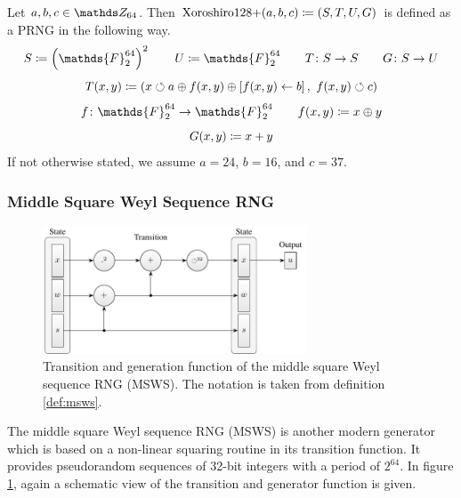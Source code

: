 \documentclass{stdlocal}
\begin{document}
    \begin{definition}[Xoroshiro128+]
    \label{def:xoroshiro}
      Let $a,b,c \in \setInteger_{64}$.
      Then $\mathrm{Xoroshiro128+}(a,b,c)\coloneqq (S,T,U,G)$ is defined as a PRNG in the following way.
      \[
        S \define \roundBrackets{\mathds{F}_2^{64}}^2
        \separate
        U \define \mathds{F}_2^{64}
        \separate
        \function{T}{S}{S}
        \separate
        \function{G}{S}{U}
      \]
      \[
        T(x,y) \coloneqq (x \circlearrowleft a \oplus f(x,y) \oplus \left[ f(x,y) \leftarrow b \right],\ f(x,y) \circlearrowleft c)
      \]
      \[
        \function{f}{\mathds{F}_2^{64}}{\mathds{F}_2^{64}}
        \separate
        f(x,y) \define x \oplus y
      \]
      \[
        G(x,y) \coloneqq x + y
      \]
      If not otherwise stated, we assume $a=24$, $b=16$, and $c=37$.
    \end{definition}


  \subsubsection*{Middle Square Weyl Sequence RNG} %
    \begin{figure}
      \center
      \includegraphics[width=0.7\textwidth]{figures/msws_scheme.pdf}
      \caption[Middle Square Weyl Sequence RNG Transition and Generation]{
        Transition and generation function of the middle square Weyl sequence RNG (MSWS).
        The notation is taken from definition \ref{def:msws}.
      }
      \label{fig:msws-transition-generation}
    \end{figure}

    The middle square Weyl sequence RNG (MSWS) is another modern generator which is based on a non-linear squaring routine in its transition function.
    It provides pseudorandom sequences of 32-bit integers with a period of $2^{64}$.
    In figure \ref{fig:msws-transition-generation}, again a schematic view of the transition and generator function is given.
    \autocite{widynski2019}
\end{document}
